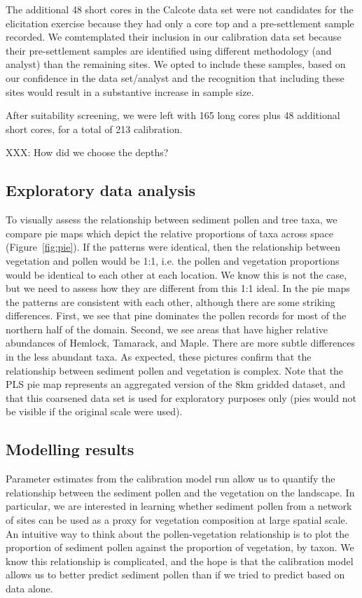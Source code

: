 \documentclass[12pt]{article}
\begin{document}
The additional 48 short cores in the Calcote data set were not candidates for
the elicitation exercise because they had only a core top and a
pre-settlement sample recorded. We comtemplated their inclusion in our
calibration data set because their pre-settlement samples are
identified using different methodology (and analyst) than the
remaining sites. We opted to include these samples, based on our
confidence in the data set/analyst and the recognition that including
these sites would result in a substantive increase in sample size.

After suitability screening, we were left with 165 long cores plus 48
additional short cores, for a total of 213 calibration.

XXX: How did we choose the depths?

\subsection{Exploratory data analysis}

To visually assess the relationship between sediment pollen and tree
taxa, we compare pie maps which depict the relative proportions of
taxa across space (Figure~\ref{fig:pie}). If the patterns were
identical, then the relationship between vegetation and pollen would
be 1:1, i.e. the pollen and vegetation proportions would be identical
to each other at each location. We know this is not the case, but we
need to assess how they are different from this 1:1 ideal. In the pie
maps the patterns are consistent with each other, although there are
some striking differences. First, we see that pine dominates the
pollen records for most of the northern half of the domain. Second, we
see areas that have higher relative abundances of Hemlock, Tamarack,
and Maple. There are more subtle differences in the less abundant
taxa. As expected, these pictures confirm that the relationship
between sediment pollen and vegetation is complex. Note that the PLS
pie map represents an aggregated version of the 8km gridded dataset,
and that this coarsened data set is used for exploratory purposes only
(pies would not be visible if the original scale were used).

\subsection{Modelling results}

Parameter estimates from the calibration model run allow us to
quantify the relationship between the sediment pollen and the
vegetation on the landscape. In particular, we are interested in
learning whether sediment pollen from a network of sites can be used
as a proxy for vegetation composition at large spatial scale. An
intuitive way to think about the pollen-vegetation relationship is to
plot the proportion of sediment pollen against the proportion of
vegetation, by taxon. We know this relationship is complicated, and
the hope is that the calibration model allows us to better predict
sediment pollen than if we tried to predict based on data alone. 
\end{document}
